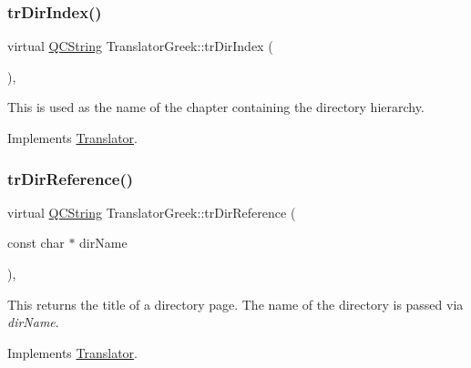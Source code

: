 \mbox{\label{class_translator_greek_aeeb3efbd6779bb55f597401e9ad0b52e}} 
\subsubsection{\texorpdfstring{trDirIndex()}{trDirIndex()}}
{\footnotesize\ttfamily virtual \mbox{\hyperlink{class_q_c_string}{Q\+C\+String}} Translator\+Greek\+::tr\+Dir\+Index (\begin{DoxyParamCaption}{ }\end{DoxyParamCaption})\hspace{0.3cm}{\ttfamily [inline]}, {\ttfamily [virtual]}}

This is used as the name of the chapter containing the directory hierarchy. 

Implements \mbox{\hyperlink{class_translator}{Translator}}.

\mbox{\label{class_translator_greek_abb0762b1cb35511608e640a6c12dbb84}} 
\subsubsection{\texorpdfstring{trDirReference()}{trDirReference()}}
{\footnotesize\ttfamily virtual \mbox{\hyperlink{class_q_c_string}{Q\+C\+String}} Translator\+Greek\+::tr\+Dir\+Reference (\begin{DoxyParamCaption}\item[{const char $\ast$}]{dir\+Name }\end{DoxyParamCaption})\hspace{0.3cm}{\ttfamily [inline]}, {\ttfamily [virtual]}}

This returns the title of a directory page. The name of the directory is passed via {\itshape dir\+Name}. 

Implements \mbox{\hyperlink{class_translator}{Translator}}.

\mbox{\label{class_translator_greek_a17c804a532c3e813f4963ace68026b02}} 
